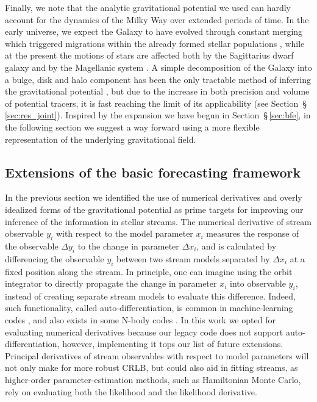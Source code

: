 \documentclass[modern]{aastex62}
\newcommand{\acronym}[1]{{\small{#1}}}
\newcommand{\CRLB}{\acronym{CRLB}}
\newcommand{\package}[1]{\textsl{#1}}
\begin{document}
Finally, we note that the analytic gravitational potential we used can hardly account for the dynamics of the Milky Way over extended periods of time.
In the early universe, we expect the Galaxy to have evolved through constant merging which triggered migrations within the already formed stellar populations \citep[e.g.,][]{elbadry2016,bonaca2017}, while at the present the motions of stars are affected both by the Sagittarius dwarf galaxy \citep{laporte2017} and by the Magellanic system \citep[e.g.,][]{gomez2015,laporte2018a}.
A simple decomposition of the Galaxy into a bulge, disk and halo component has been the only tractable method of inferring the gravitational potential \citep[e.g.,][]{lm10,koposov2010,bovy2016}, but due to the increase in both precision and volume of potential tracers, it is fast reaching the limit of its applicability (see Section~\S\,\ref{sec:res_joint}).
Inspired by the expansion we have begun in Section~\S\,\ref{sec:bfe}, in the following section we suggest a way forward using a more flexible representation of the underlying gravitational field.

\subsection{Extensions of the basic forecasting framework}
\label{sec:dis_extensions}
In the previous section we identified the use of numerical derivatives and overly idealized forms of the gravitational potential as prime targets for improving our inference of the information in stellar streams.
The numerical derivative of stream observable $y_i$ with respect to the model parameter $x_i$ measures the response of the observable $\Delta y_i$ to the change in parameter $\Delta x_i$, and is calculated by differencing the observable $y_i$ between two stream models separated by $\Delta x_i$ at a fixed position along the stream.
In principle, one can imagine using the orbit integrator to directly propagate the change in parameter $x_i$ into observable $y_i$, instead of creating separate stream models to evaluate this difference.
Indeed, such functionality, called auto-differentiation, is common in machine-learning codes \citep[e.g., \package{tensorflow},][]{tensorflow}, and also exists in some N-body codes \citep[e.g., \package{FASTPM},][]{feng2016}.
In this work we opted for evaluating numerical derivatives because our legacy code does not support auto-differentiation, however, implementing it tops our list of future extensions.
Principal derivatives of stream observables with respect to model parameters will not only make for more robust \CRLB, but could also aid in fitting streams, as higher-order parameter-estimation methods, such as Hamiltonian Monte Carlo, rely on evaluating both the likelihood and the likelihood derivative.
\end{document}
